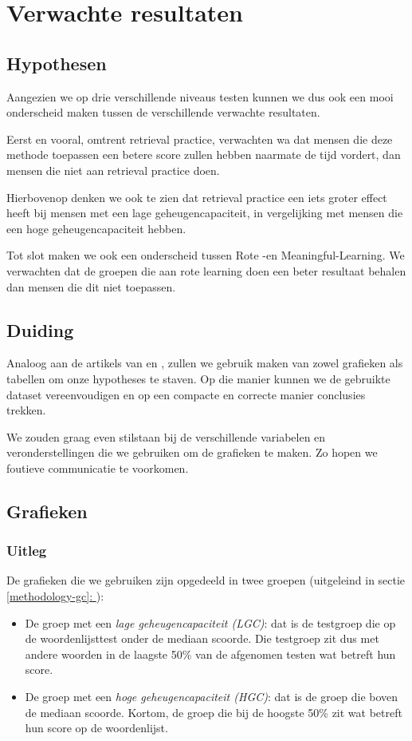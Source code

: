 \documentclass{hogent-article}
\newcommand{\customref}[1]{\underline{\ref{#1}: \nameref{#1}}}
\begin{document}
\section{Verwachte resultaten}

\subsection{Hypothesen}

Aangezien we op drie verschillende niveaus testen kunnen we dus ook een mooi onderscheid maken tussen de verschillende verwachte resultaten.

Eerst en vooral, omtrent retrieval practice, verwachten wa dat mensen die deze methode toepassen een betere score zullen hebben naarmate de tijd vordert, dan mensen die niet aan retrieval practice doen.

Hierbovenop denken we ook te zien dat retrieval practice een iets groter effect heeft bij mensen met een lage geheugencapaciteit, in vergelijking met mensen die een hoge geheugencapaciteit hebben.

Tot slot maken we ook een onderscheid tussen Rote -en Meaningful-Learning. We verwachten dat de groepen die aan rote learning doen een beter resultaat behalen dan mensen die dit niet toepassen. 

\subsection{Duiding}

Analoog aan de artikels van \textcite{Roediger_2006} en \textcite{Agarwal_2008}, zullen we gebruik maken van zowel grafieken als tabellen om onze hypotheses te staven. Op die manier kunnen we de gebruikte dataset vereenvoudigen en op een compacte en correcte manier conclusies trekken.\\
\par
\noindent
We zouden graag even stilstaan bij de verschillende variabelen en veronderstellingen die we gebruiken om de grafieken te maken. Zo hopen we foutieve communicatie te voorkomen.

\subsection{Grafieken}
\subsubsection{Uitleg}
De grafieken die we gebruiken zijn opgedeeld in twee groepen (uitgeleind in sectie \customref{methodology-gc}):
\begin{itemize}
	\item De groep met een \textit{lage geheugencapaciteit (LGC)}: dat is de testgroep die op de woordenlijsttest onder de mediaan scoorde. Die testgroep zit dus met andere woorden in de laagste 50\% van de afgenomen testen wat betreft hun score.
	\item De groep met een \textit{hoge geheugencapaciteit (HGC)}: dat is de groep die boven de mediaan scoorde. Kortom, de groep die bij de hoogste 50\% zit wat betreft hun score op de woordenlijst.
\end{itemize}
\end{document}

